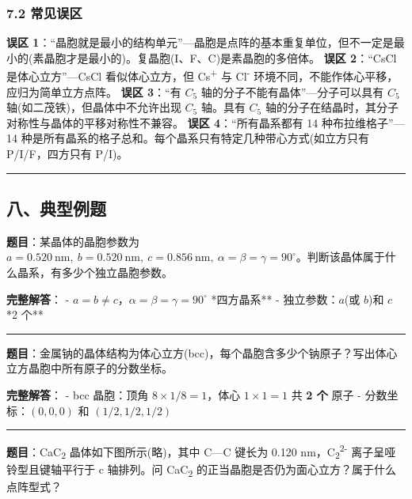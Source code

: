 \subsubsection{7.2 常见误区}\label{ux5e38ux89c1ux8befux533a}

\textbf{误区 1}：``晶胞就是最小的结构单元''---晶胞是点阵的基本重复单位，但不一定是最小的(素晶胞才是最小的)。复晶胞(I、F、C)是素晶胞的多倍体。
\textbf{误区 2}：``CsCl 是体心立方''---CsCl 看似体心立方，但 Cs\textsuperscript{+} 与 Cl\textsuperscript{-} 环境不同，不能作体心平移，应归为简单立方点阵。
\textbf{误区 3}：``有 \(C_5\) 轴的分子不能有晶体''---分子可以具有 \(C_5\) 轴(如二茂铁)，但晶体中不允许出现 \(C_5\) 轴。具有 \(C_5\) 轴的分子在结晶时，其分子对称性与晶体的平移对称性不兼容。
\textbf{误区 4}：``所有晶系都有 14 种布拉维格子''---14 种是所有晶系的格子总和。每个晶系只有特定几种带心方式(如立方只有 P/I/F，四方只有 P/I)。

\begin{center}\rule{0.5\linewidth}{0.5pt}\end{center}

\subsection{八、典型例题}\label{ux516bux5178ux578bux4f8bux9898}

\textbf{题目}：某晶体的晶胞参数为 \(a = 0.520\ \mathrm{nm},\ b = 0.520\ \mathrm{nm},\ c = 0.856\ \mathrm{nm},\ \alpha = \beta = \gamma = 90^\circ\)。判断该晶体属于什么晶系，有多少个独立晶胞参数。

\textbf{完整解答}：
- \(a = b \neq c\)，\(\alpha = \beta = \gamma = 90^\circ\) \箭 **四方晶系**
- 独立参数：\(a\)(或 \(b\))和 \(c\) \箭 **2 个**

\begin{center}\rule{0.5\linewidth}{0.5pt}\end{center}

\textbf{题目}：金属钠的晶体结构为体心立方(bcc)，每个晶胞含多少个钠原子？写出体心立方晶胞中所有原子的分数坐标。

\textbf{完整解答}：
- bcc 晶胞：顶角 \(8 \times 1/8 = 1\)，体心 \(1 \times 1 = 1\) \箭 共 \textbf{2 个} 原子
- 分数坐标：\((0, 0, 0)\) 和 \((1/2, 1/2, 1/2)\)

\begin{center}\rule{0.5\linewidth}{0.5pt}\end{center}

\textbf{题目}：CaC\textsubscript{2} 晶体如下图所示(略)，其中 C---C 键长为 0.120 nm，C\textsubscript{2}\textsuperscript{2-} 离子呈哑铃型且键轴平行于 c 轴排列。问 CaC\textsubscript{2} 的正当晶胞是否仍为面心立方？属于什么点阵型式？

